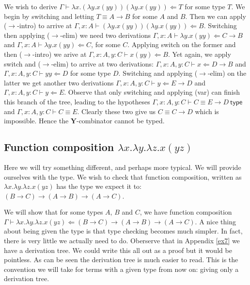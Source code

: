 \begin{example}
\begin{example}
    We wish to derive $\Gamma \vdash \lambda x . (\lambda y . x( y y)) (\lambda y . x (y y)) \Leftarrow T$ for some type $T$. We begin by switching and letting $T \equiv A \to B$ for some $A$ and $B$. Then we can apply ($\to$-intro) to arrive at $\Gamma , x : A \vdash (\lambda y . x (y y))(\lambda y . x (yy) ) \Leftarrow B$. Switching then applying ($\to$-elim) we need two derivations $\Gamma , x : A \vdash \lambda y . x (y y) \Leftarrow C \to B$ and $\Gamma , x : A \vdash \lambda y . x (y y) \Leftarrow C$, for some $C$. Applying switch on the former and then ($\to$-intro) we arive at $\Gamma , x : A, y : C \vdash x ( y y) \Leftarrow B$. Yet again, we apply switch and ($\to$-elim) to arrive at two derivations: $\Gamma, x : A, y : C \vdash x \Leftarrow D \to B$ and $\Gamma , x : A, y : C \vdash y y \Leftarrow D$ for some type $D$. Switching and applying ($\to$-elim) on the latter we get another two derivations $\Gamma , x : A, y : C \vdash y \Leftarrow E \to D$ and $\Gamma , x : A, y : C \vdash y \Leftarrow E$. Observe that only switching and applying (var) can finish this branch of the tree, leading to the hypotheses $\Gamma , x : A, y : C \vdash C \equiv E \to D \ \mathsf{type}$ and $\Gamma , x : A, y : C \vdash C \equiv E$. Clearly these two give us $C \equiv C \to D$ which is impossible. Hence the $\mathbf{Y}$-combinator cannot be typed. 
\end{example}


\subsection{Function composition $\lambda x . \lambda y . \lambda z . x ( y z)$} %

Here we will try something different, and perhaps more typical. We will provide ourselves with the type. We wish to check that function composition, written as $\lambda x.\lambda y.\lambda z.x(yz)$ has the type we expect it to: $(B \to C) \to (A \to B) \to (A \to C)$.

\begin{example}
    We will show that for some types $A$, $B$ and $C$, we have function composition $\Gamma \vdash \lambda x.\lambda y.\lambda z.x(yz) \Leftarrow (B \to C) \to (A \to B) \to (A \to C)$.
    A nice thing about being given the type is that type checking becomes much simpler. In fact, there is very little we actually need to do. Oberserve that in Appendix \ref{ex7} we have a derivation tree. We could write this all out as a proof but it would be pointless. As can be seen the derivation tree is much easier to read.
    This is the convention we will take for terms with a given type from now on: giving only a derivation tree.
    

\end{example}
\end{example}

